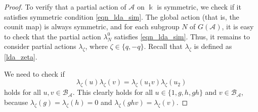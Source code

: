 \documentclass[reqno]{amsart}
\theoremstyle{definition}
\numberwithin{equation}{section}\theoremstyle{plain}
\newcommand{\B}{\mathcal{B}}
\theoremstyle{definition}
\def \A {\mathcal{A}}
\begin{document}
\begin{proof}
To verify that a partial action of $\A$ on $\Bbbk$ is symmetric, we check if it satisfies symmetric condition \eqref{eqn_lda_sim}.
The global action (that is, the counit map) is always symmetric, and for each subgroup $N$ of $G(\A)$, it is easy to check that the partial action $\lambda_N^0$ satisfies \eqref{eqn_lda_sim}.
Thus, it remains to consider partial actions $\lambda_\zeta$, where $\zeta \in \{q, -q\}$. Recall that $\lambda_\zeta$ is defined as \eqref{lda_zeta}.

We need to check if 
\begin{equation}\label{eq_sim_A}
\lambda_\zeta(u)\lambda_\zeta(v) = \lambda_\zeta(u_1 v) \lambda_\zeta(u_2)
\end{equation}
holds for all $u, v \in \B_\A.$
This clearly holds for all $u \in \{1, g, h, gh\}$ and $v \in \B_\A$, because \(\lambda_\zeta(g) = \lambda_\zeta(h) = 0\) and \(\lambda_\zeta(ghv) = \lambda_\zeta(v)\). 


\end{proof}
\end{document}
